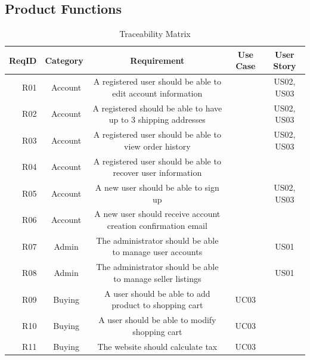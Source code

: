 \documentclass[11pt]{article}
\newcounter{use case ID}
\begin{document}
\subsection{Product Functions}
\begin{table}[htbp]
                    \caption{Traceability Matrix}
                    \begin{center}
                        \begin{tabular}{|r | c| c | c| c|}
                            \hline
                            ReqID & Category & Requirement & Use Case & User Story \\
                            \hline
                            R01 & \ Account & A registered user should be able to edit account information & & US02, US03 \\
                             \hline
                            R02 & \ Account & A registered should be able to have up to 3 shipping addresses &  & US02, US03 \\ 
                             \hline
                            R03 & \ Account & A registered user should be able to view order history &  & US02, US03 \\ 
                            \hline
                            R04 & \ Account & A registered user should be able to recover user information & &  \\
                            \hline
                            R05 & \ Account & A new user should be able to sign up & & US02, US03  \\
                            \hline
                            R06 & \ Account & A new user should receive account creation confirmation email & &  \\
                            \hline
                            R07 & \ Admin & The administrator should be able to manage user accounts & & US01  \\
                            \hline
                            R08 & \ Admin & The administrator should be able to manage seller listings &  & US01 \\ 
                             \hline
                            R09 & \ Buying & A user should be able to add product to shopping cart & UC03 &  \\
                            \hline
                            R10 & \ Buying & A user should be able to modify shopping cart & UC03 &  \\
                            \hline
                            R11 & \ Buying & The website should calculate tax & UC03 &  \\

\end{tabular}
\end{center}
\end{table}
\end{document}

